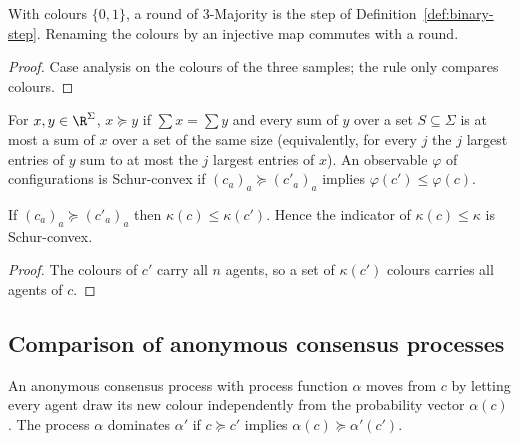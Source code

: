\begin{lemma}\label{lem:as-bool}
\leanok{}
With colours $\{0,1\}$, a round of 3-Majority is the step of Definition~\ref{def:binary-step}.
Renaming the colours by an injective map commutes with a round.
\end{lemma}
\begin{proof}\leanok
Case analysis on the colours of the three samples; the rule only compares colours.
\end{proof}

\begin{definition}\label{def:as-majorization}
\leanok
{}
For $x,y\in\R^\Sigma$, $x\succeq y$ if $\sum x=\sum y$ and every sum of $y$ over a set
$S\subseteq\Sigma$ is at most a sum of $x$ over a set of the same size (equivalently, for every $j$
the $j$ largest entries of $y$ sum to at most the $j$ largest entries of $x$). An observable $\varphi$
of configurations is Schur-convex if $(c_a)_a\succeq(c'_a)_a$ implies $\varphi(c')\le\varphi(c)$.
\end{definition}

\begin{lemma}\label{lem:as-colours}
\leanok
{}
If $(c_a)_a\succeq(c'_a)_a$ then $\kappa(c)\le\kappa(c')$. Hence the indicator of
$\kappa(c)\le\kappa$ is Schur-convex.
\end{lemma}
\begin{proof}\leanok
The colours of $c'$ carry all $n$ agents, so a set of $\kappa(c')$ colours carries all agents of $c$.
\end{proof}

\subsection{Comparison of anonymous consensus processes}

\begin{definition}\label{def:as-ac}
\leanok{}
An anonymous consensus process with process function $\alpha$ moves from $c$ by letting every
agent draw its new colour independently from the probability vector $\alpha(c)$. The process
$\alpha$ dominates $\alpha'$ if $c\succeq c'$ implies $\alpha(c)\succeq\alpha'(c')$.
\end{definition}

